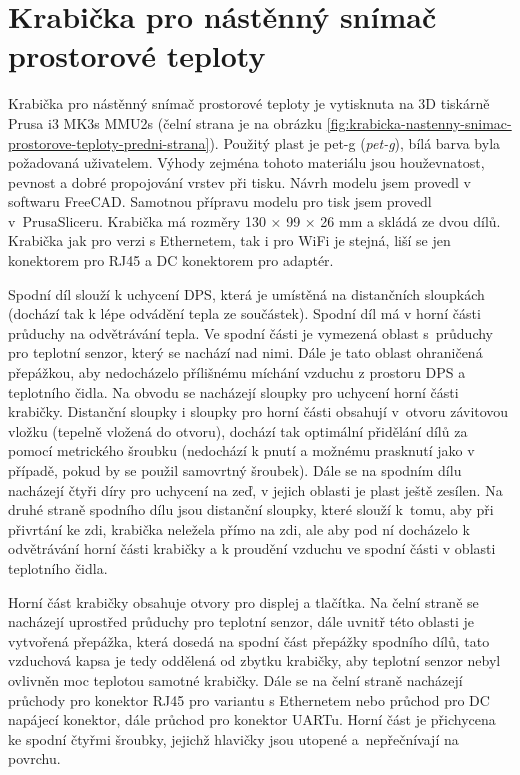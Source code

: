 \section{Krabička pro nástěnný snímač prostorové teploty}
\label{sec:krabicka-pro-nastenny-snimac-prostorove-teploty}
Krabička pro nástěnný snímač prostorové teploty je vytisknuta na 3D tiskárně Prusa i3 MK3s MMU2s (čelní strana je na obrázku \ref{fig:krabicka-nastenny-snimac-prostorove-teploty-predni-strana}). Použitý plast je \acrshort{pet-g} (\textit{\acrlong{pet-g}}), bílá barva byla požadovaná uživatelem. Výhody zejména tohoto materiálu jsou houževnatost, pevnost a dobré propojování vrstev při tisku. Návrh modelu jsem provedl v softwaru FreeCAD. Samotnou přípravu modelu pro tisk jsem provedl v~PrusaSliceru. Krabička má rozměry 130 × 99 × 26 mm a skládá ze dvou dílů. Krabička jak pro verzi s Ethernetem, tak i pro WiFi je stejná, liší se jen konektorem pro RJ45 a DC konektorem pro adaptér.

Spodní díl slouží k uchycení DPS, která je umístěná na distančních sloupkách (dochází tak k lépe odvádění tepla ze součástek). Spodní díl má v horní části průduchy na odvětrávání tepla. Ve spodní části je vymezená oblast s~průduchy pro teplotní senzor, který se nachází nad nimi. Dále je tato oblast ohraničená přepážkou, aby nedocházelo přílišnému míchání vzduchu z prostoru DPS a teplotního čidla. Na obvodu se nacházejí sloupky pro uchycení horní části krabičky. Distanční sloupky i sloupky pro horní části obsahují v~otvoru závitovou vložku (tepelně vložená do otvoru), dochází tak optimální přidělání dílů za pomocí metrického šroubku (nedochází k pnutí a možnému prasknutí jako v případě, pokud by se použil samovrtný šroubek). Dále se na spodním dílu nacházejí čtyři díry pro uchycení na zeď, v jejich oblasti je plast ještě zesílen. Na druhé straně spodního dílu jsou distanční sloupky, které slouží k~tomu, aby při přivrtání ke zdi, krabička neležela přímo na zdi, ale aby pod ní docházelo k odvětrávání horní části krabičky a k proudění vzduchu ve spodní části v oblasti teplotního čidla.

Horní část krabičky obsahuje otvory pro displej a tlačítka. Na čelní straně se nacházejí uprostřed průduchy pro teplotní senzor, dále uvnitř této oblasti je vytvořená přepážka, která dosedá na spodní část přepážky spodního dílů, tato vzduchová kapsa je tedy oddělená od zbytku krabičky, aby teplotní senzor nebyl ovlivněn moc teplotou samotné krabičky. Dále se na čelní straně nacházejí průchody pro konektor RJ45 pro variantu s Ethernetem nebo průchod pro DC napájecí konektor, dále průchod pro konektor UARTu. Horní část je přichycena ke spodní čtyřmi šroubky, jejichž hlavičky jsou utopené a~nepřečnívají na povrchu.

